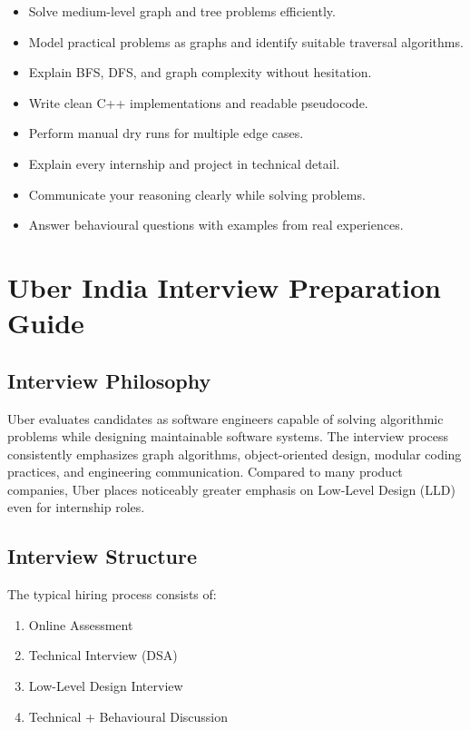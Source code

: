 \documentclass[11pt,a4paper]{article}
\begin{document}
\begin{itemize}
	\item Solve medium-level graph and tree problems efficiently.
	\item Model practical problems as graphs and identify suitable traversal algorithms.
	\item Explain BFS, DFS, and graph complexity without hesitation.
	\item Write clean C++ implementations and readable pseudocode.
	\item Perform manual dry runs for multiple edge cases.
	\item Explain every internship and project in technical detail.
	\item Communicate your reasoning clearly while solving problems.
	\item Answer behavioural questions with examples from real experiences.
\end{itemize}

\section{Uber India Interview Preparation Guide}

\subsection{Interview Philosophy}

Uber evaluates candidates as software engineers capable of solving algorithmic problems while designing maintainable software systems. The interview process consistently emphasizes graph algorithms, object-oriented design, modular coding practices, and engineering communication. Compared to many product companies, Uber places noticeably greater emphasis on Low-Level Design (LLD) even for internship roles.


\subsection{Interview Structure}

The typical hiring process consists of:

\begin{enumerate}
	\item Online Assessment
	\item Technical Interview (DSA)
	\item Low-Level Design Interview
	\item Technical + Behavioural Discussion
\end{enumerate}
\end{document}
